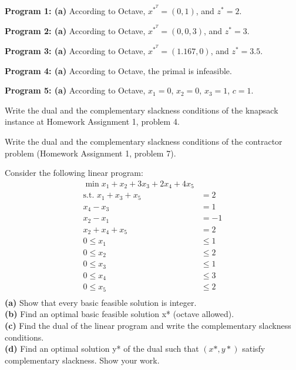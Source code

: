 \documentclass[fleqn]{homework}
\begin{document}
\begin{problem}{2}
    \textbf{Program 1: (a)} According to Octave, $x^*^T = (0, 1)$, and
    $z^* = 2$.

    \textbf{Program 2: (a)} According to Octave, $x^*^T = (0, 0, 3)$, and
    $z^* = 3$.

    \textbf{Program 3: (a)} According to Octave, $x^*^T = (1.167, 0)$, and
    $z^* = 3.5$.

    \textbf{Program 4: (a)} According to Octave, the primal is infeasible.

    \textbf{Program 5: (a)} According to Octave, $x_1 = 0$, $x_2 = 0$,
    $x_3 = 1$, $c = 1$.

  \end{problem}

  \begin{problem}{3}
    \begin{question}
      Write the dual and the complementary slackness conditions of the knapsack
      instance at Homework Assignment 1, problem 4.
    \end{question}
  \end{problem}

  \begin{problem}{4}
    \begin{question}
      Write the dual and the complementary slackness conditions of the
      contractor problem (Homework Assignment 1, problem 7).
    \end{question}
  \end{problem}

  \begin{problem}{5}
    \begin{question}
      Consider the following linear program:
      \begin{align*}
        \min x_1 + x_2 + 3x_3 + 2x_4 + 4x_5 & \\
        \text{s.t. } x_1 + x_3 + x_5 &= 2 \\
        x_4 - x_3 &= 1 \\
        x_2 - x_1 &= -1 \\
        x_2 + x_4 + x_5 &= 2 \\
        0 \le x_1 &\le 1 \\
        0 \le x_2 &\le 2 \\
        0 \le x_3 &\le 1 \\
        0 \le x_4 &\le 3 \\
        0 \le x_5 &\le 2 \\
      \end{align*}
      \textbf{(a)} Show that every basic feasible solution is integer.\\
      \textbf{(b)} Find an optimal basic feasible solution x* (octave allowed).\\
      \textbf{(c)} Find the dual of the linear program and write the
      complementary slackness conditions.\\
      \textbf{(d)} Find an optimal solution y* of the dual such that $(x*, y*)$
      satisfy complementary slackness. Show your work.\\
    \end{question}
  \end{problem}
\end{document}
